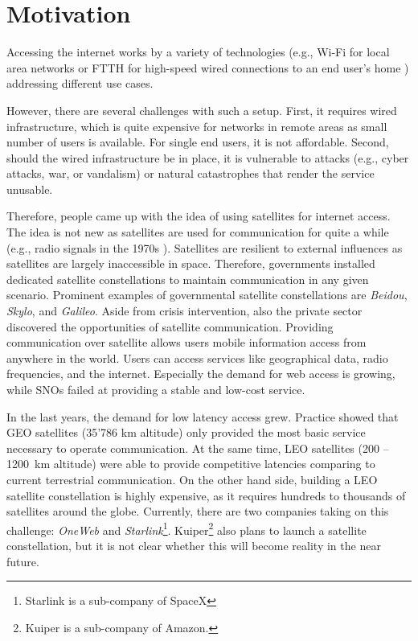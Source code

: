 \section{Motivation} \label{sec:motivation}

Accessing the internet works by a variety of technologies (e.g., Wi-Fi for
local area networks \cite{Henry2002} or \ac{FTTH} for high-speed wired
connections to an end user's home \cite{Aleksic2010}) addressing different use
cases.

However, there are several challenges with such a setup. First, it requires
wired infrastructure, which is quite expensive for networks in remote areas as
small number of users is available. For single end users, it is not affordable.
Second, should the wired infrastructure be in place, it is vulnerable to
attacks (e.g., cyber attacks, war, or vandalism) or natural catastrophes that
render the service unusable.

Therefore, people came up with the idea of using satellites for internet
access. The idea is not new as satellites are used for communication for quite
a while (e.g., radio signals in the 1970s \cite{Davies1980}). Satellites are
resilient to external influences as satellites are largely inaccessible in
space. Therefore, governments installed dedicated satellite constellations to
maintain communication in any given scenario. Prominent examples of
governmental satellite constellations are \textit{Beidou}, \textit{Skylo}, and
\textit{Galileo}. Aside from crisis intervention, also the private sector
discovered the opportunities of satellite communication. Providing
communication over satellite allows users mobile information access from
anywhere in the world. Users can access services like geographical data, radio
frequencies, and the internet. Especially the demand for web access is growing,
while \ac{SNO}s failed at providing a stable and low-cost
service\cite{Barboza2000, Chan2002}.

In the last years, the demand for low latency access grew. Practice showed that
\ac{GEO} satellites (35'786 km altitude) only provided the most basic service
necessary to operate communication\cite{DBLP:journals/pacmnet/RamanVCSZ23}. At the same time, \ac{LEO} satellites (200
-- 1200~km altitude) were able to provide competitive latencies comparing to
current terrestrial communication\cite{DBLP:conf/infocom/MaCZCML23}. On the other hand side, building a \ac{LEO}
satellite constellation is highly expensive, as it requires hundreds to
thousands of satellites around the globe. Currently, there are two companies
taking on this challenge: \textit{OneWeb} and
\textit{Starlink}\footnote{Starlink is a sub-company of SpaceX}.
Kuiper\footnote{Kuiper is a sub-company of Amazon.} also plans to launch a
satellite constellation, but it is not clear whether this will become reality
in the near future\cite{Kohnmann24}.

